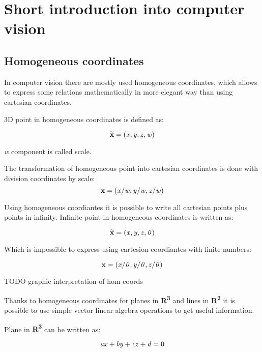 \documentclass[a4paper,12pt]{report}
\newcommand{\evect}[1]{
{\bf #1}
}
\newcommand{\ehvect}[1]{
{\bf \widetilde{#1}}
}
\newcommand{\escal}[1]{
{\it #1}
}
\newcommand{\eucl}[1]{
{\bf R\textsuperscript{#1}}
}
\begin{document}
\section{Short introduction into computer vision}

\subsection{Homogeneous coordinates}

In computer vision there are mostly used homogeneous coordinates, which allows to express some relations
mathematically in more elegant way than using cartesian coordinates. 

3D point in homogeneous coordinates is defined as:

\begin{equation}
\ehvect{x} = (\escal{x}, \escal{y}, \escal{z}, \escal{w})
\end{equation}

\escal{w} component is called scale.

The transformation of homogeneous point into cartesian coordinates is done with division 
coordinates by scale:
\begin{equation}
\evect{x} = (\escal{x} / \escal{w}, \escal{y} / \escal{w}, \escal{z} / \escal{w})
\end{equation}

Using homogeneous coordiantes it is possible to write all cartesian points plus points in infinity.
Infinite point in homogeneous coordinates is written as: 

\begin{equation}
\ehvect{x} = (\escal{x}, \escal{y}, \escal{z}, \escal{0})
\end{equation}

Which is impossible to express using cartesion coordiantes with finite numbers:

\begin{equation}
\evect{x} = (\escal{x} / \escal{0}, \escal{y} / \escal{0}, \escal{z} / \escal{0})
\end{equation}

TODO graphic interpretation of hom coords 

Thanks to homogeneous coordinates for planes in \eucl{3} and lines in \eucl{2} it is possible to use simple vector linear algebra operations 
to get useful information.

Plane in \eucl{3} can be written as:

\begin{equation}
\escal{a}\escal{x} + \escal{b}\escal{y} + \escal{c}\escal{z} + \escal{d} = 0
\end{equation}
\end{document}
